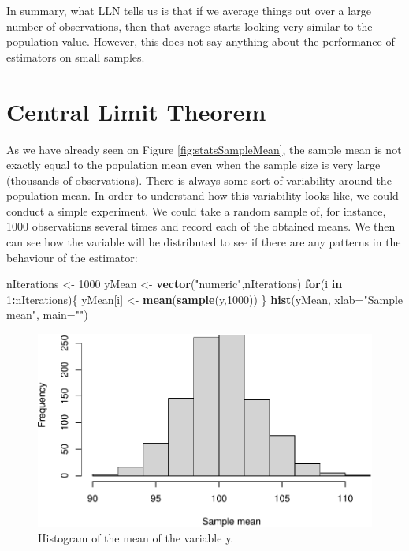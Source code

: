 \documentclass[
]{book}
\newenvironment{Shaded}{\begin{snugshade}}{\end{snugshade}}
\newcommand{\AttributeTok}[1]{\textcolor[rgb]{0.13,0.29,0.53}{#1}}
\newcommand{\ControlFlowTok}[1]{\textcolor[rgb]{0.13,0.29,0.53}{\textbf{#1}}}
\newcommand{\DecValTok}[1]{\textcolor[rgb]{0.00,0.00,0.81}{#1}}
\newcommand{\FunctionTok}[1]{\textcolor[rgb]{0.13,0.29,0.53}{\textbf{#1}}}
\newcommand{\NormalTok}[1]{#1}
\newcommand{\OtherTok}[1]{\textcolor[rgb]{0.56,0.35,0.01}{#1}}
\newcommand{\SpecialCharTok}[1]{\textcolor[rgb]{0.81,0.36,0.00}{\textbf{#1}}}
\newcommand{\StringTok}[1]{\textcolor[rgb]{0.31,0.60,0.02}{#1}}
\theoremstyle{definition}
\theoremstyle{definition}
\theoremstyle{definition}
\theoremstyle{definition}
\theoremstyle{remark}
\begin{document}
In summary, what LLN tells us is that if we average things out over a large number of observations, then that average starts looking very similar to the population value. However, this does not say anything about the performance of estimators on small samples.

\section{Central Limit Theorem}\label{CLT}

As we have already seen on Figure \ref{fig:statsSampleMean}, the sample mean is not exactly equal to the population mean even when the sample size is very large (thousands of observations). There is always some sort of variability around the population mean. In order to understand how this variability looks like, we could conduct a simple experiment. We could take a random sample of, for instance, 1000 observations several times and record each of the obtained means. We then can see how the variable will be distributed to see if there are any patterns in the behaviour of the estimator:

\begin{Shaded}
\begin{Highlighting}[]
\NormalTok{nIterations }\OtherTok{\textless{}{-}} \DecValTok{1000}
\NormalTok{yMean }\OtherTok{\textless{}{-}} \FunctionTok{vector}\NormalTok{(}\StringTok{"numeric"}\NormalTok{,nIterations)}
\ControlFlowTok{for}\NormalTok{(i }\ControlFlowTok{in} \DecValTok{1}\SpecialCharTok{:}\NormalTok{nIterations)\{}
\NormalTok{    yMean[i] }\OtherTok{\textless{}{-}} \FunctionTok{mean}\NormalTok{(}\FunctionTok{sample}\NormalTok{(y,}\DecValTok{1000}\NormalTok{))}
\NormalTok{\}}
\FunctionTok{hist}\NormalTok{(yMean, }\AttributeTok{xlab=}\StringTok{"Sample mean"}\NormalTok{, }\AttributeTok{main=}\StringTok{""}\NormalTok{)}
\end{Highlighting}
\end{Shaded}

\begin{figure}
\centering
\includegraphics{Svetunkov---Statistics-for-Business-Analytics_files/figure-latex/histyMean-1.pdf}
\caption{\label{fig:histyMean}Histogram of the mean of the variable y.}
\end{figure}
\end{document}
